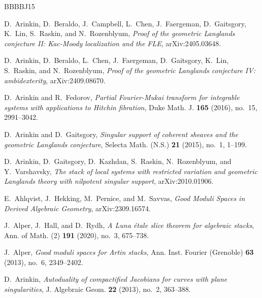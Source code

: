 \documentclass [11pt,oneside,a4paper,mathscr]{amsart}
\theoremstyle{definition}
\begin{document}
\newcommand{\etalchar}[1]{$^{#1}$}
\providecommand{\bysame}{\leavevmode\hbox to3em{\hrulefill}\thinspace}
\providecommand{\MR}{\relax\ifhmode\unskip\space\fi MR }
\providecommand{\MRhref}[2]{%
  \href{http://www.ams.org/mathscinet-getitem?mr=#1}{#2}
}
\providecommand{\href}[2]{#2}
\begin{thebibliography}{BBBBJ15}

\bibitem[ABC{\etalchar{+}}a]{GLC2}
D.~Arinkin, D.~Beraldo, J.~Campbell, L.~Chen, J.~Faergeman, D.~Gaitsgory, K.~Lin, S.~Raskin, and N.~Rozenblyum, \emph{Proof of the geometric {L}anglands conjecture {II}: {K}ac-{M}oody localization and the {FLE}}, arXiv:2405.03648.

\bibitem[ABC{\etalchar{+}}b]{GLC4}
D.~Arinkin, D.~Beraldo, L.~Chen, J.~Faergeman, D.~Gaitsgory, K.~Lin, S.~Raskin, and N.~Rozenblyum, \emph{Proof of the geometric {L}anglands conjecture {IV}: ambidexterity}, arXiv:2409.08670.

D.~Arinkin and R.~Fedorov, \emph{Partial {F}ourier-{M}ukai transform for integrable systems with applications to {H}itchin fibration}, Duke Math. J. \textbf{165} (2016), no.~15, 2991--3042.

D.~Arinkin and D.~Gaitsgory, \emph{Singular support of coherent sheaves and the geometric {L}anglands conjecture}, Selecta Math. (N.S.) \textbf{21} (2015), no.~1, 1--199.

\bibitem[AGK{\etalchar{+}}]{AGKRRV}
D.~Arinkin, D.~Gaitsgory, D.~Kazhdan, S.~Raskin, N.~Rozenblyum, and Y.~Varshavsky, \emph{The stack of local systems with restricted variation and geometric {L}anglands theory with nilpotent singular support}, arXiv:2010.01906.

E.~Ahlqvist, J.~Hekking, M.~Pernice, and M.~Savvas, \emph{Good {M}oduli {S}paces in {D}erived {A}lgebraic {G}eometry}, arXiv:2309.16574.

J.~Alper, J.~Hall, and D.~Rydh, \emph{A {L}una \'etale slice theorem for algebraic stacks}, Ann. of Math. (2) \textbf{191} (2020), no.~3, 675--738.

J.~Alper, \emph{Good moduli spaces for {A}rtin stacks}, Ann. Inst. Fourier (Grenoble) \textbf{63} (2013), no.~6, 2349--2402.

D.~Arinkin, \emph{Autoduality of compactified {J}acobians for curves with plane singularities}, J. Algebraic Geom. \textbf{22} (2013), no.~2, 363--388.


\end{thebibliography}
\end{document}
